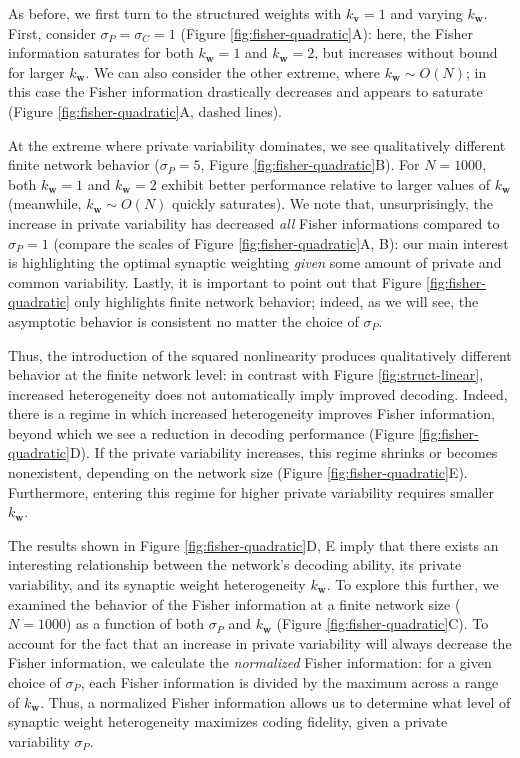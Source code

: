 \documentclass[11pt]{article}
\begin{document}
	As before, we first turn to the structured weights with $k_{\mathbf{v}}=1$ and varying $k_{\mathbf{w}}$. First, consider $\sigma_P= \sigma_C=1$ (Figure \ref{fig:fisher-quadratic}A): here, the Fisher information saturates for both $k_{\mathbf{w}}=1$ and $k_{\mathbf{w}}=2$, but increases without bound for larger $k_{\mathbf{w}}$. We can also consider the other extreme, where $k_{\mathbf{w}}\sim O(N)$; in this case the Fisher information drastically decreases and  appears to saturate (Figure \ref{fig:fisher-quadratic}A, dashed lines). 
	
	At the extreme where private variability dominates, we see qualitatively different finite network behavior ($\sigma_P=5$, Figure \ref{fig:fisher-quadratic}B). For  $N=1000$,  both $k_{\mathbf{w}}=1$ and $k_{\mathbf{w}}=2$ exhibit better performance relative to larger values of $k_{\mathbf{w}}$ (meanwhile, $k_{\mathbf{w}} \sim O(N)$  quickly saturates). We note that, unsurprisingly, the increase in private variability has decreased \textit{all} Fisher informations compared to $\sigma_P=1$ (compare the scales of Figure \ref{fig:fisher-quadratic}A, B): our main interest is highlighting the optimal synaptic weighting \textit{given} some amount of private and common variability. Lastly, it is important to point out that Figure \ref{fig:fisher-quadratic} only highlights finite network behavior; indeed, as we will see, the asymptotic behavior is consistent no matter the choice of $\sigma_P$.
	
	Thus, the introduction of the squared nonlinearity produces qualitatively different behavior at the finite network level: in contrast with Figure \ref{fig:struct-linear}, increased heterogeneity does not automatically imply improved decoding. Indeed, there is a regime in which increased heterogeneity improves Fisher information, beyond which we see a reduction in decoding performance (Figure \ref{fig:fisher-quadratic}D). If the private variability increases, this regime shrinks or becomes nonexistent, depending on the network size (Figure \ref{fig:fisher-quadratic}E). Furthermore, entering this regime for higher private variability requires smaller $k_{\mathbf{w}}$. 
	
	The results shown in Figure \ref{fig:fisher-quadratic}D, E imply that there exists an interesting relationship between the network's decoding ability, its private variability, and its synaptic weight heterogeneity $k_{\mathbf{w}}$. To explore this further, we examined the behavior of the Fisher information at a finite network size ($N=1000$) as a function of both $\sigma_P$ and $k_{\mathbf{w}}$ (Figure \ref{fig:fisher-quadratic}C).  To account for the fact that an increase in private variability will always decrease the Fisher information, we calculate the \textit{normalized} Fisher information: for a given choice of $\sigma_P$, each Fisher information is divided by the maximum across a range of $k_{\mathbf{w}}$. Thus, a normalized Fisher information allows us to determine what level of synaptic weight heterogeneity maximizes coding fidelity, given a private variability $\sigma_P$.
	
\end{document}
